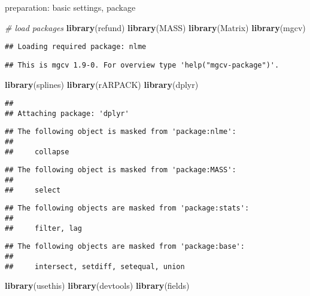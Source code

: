 \documentclass[
]{article}
\author{}
\date{\vspace{-2.5em}}
\newenvironment{Shaded}{\begin{snugshade}}{\end{snugshade}}
\newcommand{\CommentTok}[1]{\textcolor[rgb]{0.56,0.35,0.01}{\textit{#1}}}
\newcommand{\FunctionTok}[1]{\textcolor[rgb]{0.13,0.29,0.53}{\textbf{#1}}}
\newcommand{\NormalTok}[1]{#1}
\begin{document}
preparation: basic settings, package

\begin{Shaded}
\begin{Highlighting}[]
\CommentTok{\# load packages}
\FunctionTok{library}\NormalTok{(refund)}
\FunctionTok{library}\NormalTok{(MASS)}
\FunctionTok{library}\NormalTok{(Matrix)}
\FunctionTok{library}\NormalTok{(mgcv)}
\end{Highlighting}
\end{Shaded}

\begin{verbatim}
## Loading required package: nlme
\end{verbatim}

\begin{verbatim}
## This is mgcv 1.9-0. For overview type 'help("mgcv-package")'.
\end{verbatim}

\begin{Shaded}
\begin{Highlighting}[]
\FunctionTok{library}\NormalTok{(splines)}
\FunctionTok{library}\NormalTok{(rARPACK)}
\FunctionTok{library}\NormalTok{(dplyr)}
\end{Highlighting}
\end{Shaded}

\begin{verbatim}
## 
## Attaching package: 'dplyr'
\end{verbatim}

\begin{verbatim}
## The following object is masked from 'package:nlme':
## 
##     collapse
\end{verbatim}

\begin{verbatim}
## The following object is masked from 'package:MASS':
## 
##     select
\end{verbatim}

\begin{verbatim}
## The following objects are masked from 'package:stats':
## 
##     filter, lag
\end{verbatim}

\begin{verbatim}
## The following objects are masked from 'package:base':
## 
##     intersect, setdiff, setequal, union
\end{verbatim}

\begin{Shaded}
\begin{Highlighting}[]
\FunctionTok{library}\NormalTok{(usethis)}
\FunctionTok{library}\NormalTok{(devtools)}
\FunctionTok{library}\NormalTok{(fields)}
\end{Highlighting}
\end{Shaded}
\end{document}
